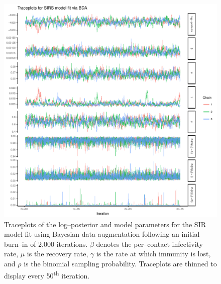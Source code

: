 \begin{figure}[htbp]
	\centering
	\includegraphics[width=0.9\linewidth]{figures/sirs_bda_traceplots}
	\caption[Simulation 1 MCMC traceplots for an SIR model fit using Bayesian data augmentation.]{Traceplots of the log--posterior and model parameters for the SIR model fit using Bayesian data augmentation following an initial burn--in of 2,000 iterations. $ \beta $ denotes the per--contact infectivity rate, $ \mu $ is the recovery rate, $\gamma$ is the rate at which immunity is lost, and $ \rho $ is the binomial sampling probability. Traceplots are thinned to display every 50\textsuperscript{th} iteration.}
	\label{fig:sirsbdatraceplots}
\end{figure}

